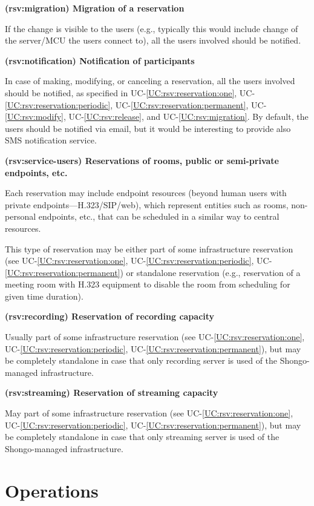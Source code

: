 \documentclass[a4paper]{report}
\makeatletter
\newcounter{UCcounter}
\newenvironment{UseCases}%
	{\begin{list}{\textbf{UC-\arabic{UCcounter}}}{\@nmbrlisttrue\def\@listctr{UCcounter}}}%
	{\end{list}}
\newcommand{\UClabel}[1]{\label{UC:#1}}
\newcommand{\UCref}[1]{UC-\ref{UC:#1}}
\newcommand{\UseCase}[2]{\item\UClabel{#2} \textbf{(#2) #1}\\ \nopagebreak}
\makeatother
\begin{document}
\begin{UseCases}
\UseCase{Migration of a reservation}{rsv:migration}

If the change is visible to the users (e.g., typically this would include
change of the server/MCU the users connect to), all the users involved should
be notified.

\UseCase{Notification of participants}{rsv:notification}

In case of making, modifying, or canceling a reservation, all the users
involved should be notified, as specified in \UCref{rsv:reservation:one},
\UCref{rsv:reservation:periodic}, \UCref{rsv:reservation:permanent},
\UCref{rsv:modify}, \UCref{rsv:release}, and \UCref{rsv:migration}. By default,
the users should be notified via email, but it would be interesting to provide
also SMS notification service.

\UseCase{Reservations of rooms, public or semi-private endpoints,
etc.}{rsv:service-users}

Each reservation may include endpoint resources (beyond human users with
private endpoints---H.323/SIP/web), which represent entities such as rooms,
non-personal endpoints, etc., that can be scheduled in a similar way to central
resources.

This type of reservation may be either part of some infrastructure reservation
(see \UCref{rsv:reservation:one}, \UCref{rsv:reservation:periodic},
\UCref{rsv:reservation:permanent}) or standalone reservation (e.g., reservation
of a meeting room with H.323 equipment to disable the room from scheduling for
given time duration).


\UseCase{Reservation of recording capacity}{rsv:recording}

Usually part of some infrastructure reservation (see
\UCref{rsv:reservation:one}, \UCref{rsv:reservation:periodic},
\UCref{rsv:reservation:permanent}), but may be completely standalone in case
that only recording server is used of the Shongo-managed infrastructure.


\UseCase{Reservation of streaming capacity}{rsv:streaming}

May part of some infrastructure reservation (see \UCref{rsv:reservation:one},
\UCref{rsv:reservation:periodic}, \UCref{rsv:reservation:permanent}), but may
be completely standalone in case that only streaming server is used of the
Shongo-managed infrastructure.

\end{UseCases}


\section{Operations}
\end{document}
